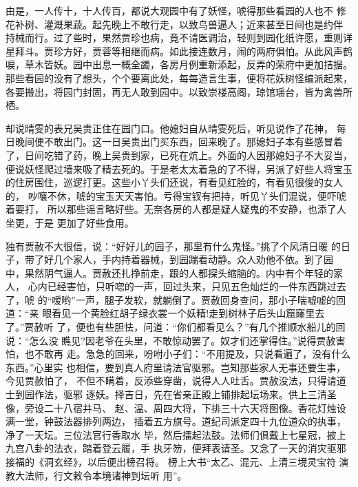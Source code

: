 由是，一人传十，十人传百，都说大观园中有了妖怪，唬得那些看园的人也不
修花补树、灌溉果蔬。起先晚上不敢行走，以致鸟兽逼人；近来甚至日间也是约伴
持械而行。过了些时，果然贾珍也病，竟不请医调治，轻则到园化纸许愿，重则详
星拜斗。贾珍方好，贾蓉等相继而病。如此接连数月，闹的两府俱怕。从此风声鹤
唳，草木皆妖。园中出息一概全蠲，各房月例重新添起，反弄的荣府中更加拮据。
那些看园的没有了想头，个个要离此处，每每造言生事，便将花妖树怪编派起来，
各要搬出，将园门封固，再无人敢到园中。以致崇楼高阁，琼馆瑶台，皆为禽兽所
栖。

却说晴雯的表兄吴贵正住在园门口。他媳妇自从晴雯死后，听见说作了花神，
每日晚间便不敢出门。这一日吴贵出门买东西，回来晚了。那媳妇子本有些感冒着
了，日间吃错了药，晚上吴贵到家，已死在炕上。外面的人因那媳妇子不大妥当，
便说妖怪爬过墙来吸了精去死的。于是老太太着急的了不得，另派了好些人将宝玉
的住房围住，巡逻打更。这些小丫头们还说，有看见红脸的，有看见很俊的女人的，
吵嚷不休，唬的宝玉天天害怕。亏得宝钗有把持，听见丫头们混说，便吓唬着要打，
所以那些谣言略好些。无奈各房的人都是疑人疑鬼的不安静，也添了人坐更，于是
更加了好些食用。

独有贾赦不大很信，说：“好好儿的园子，那里有什么鬼怪。”挑了个风清日暖
的日子，带了好几个家人，手内持着器械，到园踹看动静。众人劝他不依。到了园
中，果然阴气逼人。贾赦还扎挣前走，跟的人都探头缩脑的。内中有个年轻的家人，
心内已经害怕，只听唿的一声，回过头来，只见五色灿烂的一件东西跳过去了，唬
的“嗳哟”一声，腿子发软，就躺倒了。贾赦回身查问，那小子喘嘘嘘的回道：“亲
眼看见一个黄脸红胡子绿衣裳一个妖精!走到树林子后头山窟窿里去了。”贾赦听
了，便也有些胆怯，问道：“你们都看见么？”有几个推顺水船儿的回说：“怎么没
瞧见?因老爷在头里，不敢惊动罢了。奴才们还掌得住。”说得贾赦害怕，也不敢再
走。急急的回来，吩咐小子们：“不用提及，只说看遍了，没有什么东西。”心里实
也相信，要到真人府里请法官驱邪。岂知那些家人无事还要生事，今见贾赦怕了，
不但不瞒着，反添些穿凿，说得人人吐舌。贾赦没法，只得请道士到园作法，驱邪
逐妖。择吉日，先在省亲正殿上铺排起坛场来。供上三清圣像，旁设二十八宿并马、
赵、温、周四大将，下排三十六天将图像。香花灯烛设满一堂，钟鼓法器排列两边，
插着五方旗号。道纪司派定四十九位道众的执事，净了一天坛。三位法官行香取水
毕，然后擂起法鼓。法师们俱戴上七星冠，披上九宫八卦的法衣，踏着登云履，手
执牙笏，便拜表请圣。又念了一天的消灾驱邪接福的《洞玄经》，以后便出榜召将。
榜上大书“太乙、混元、上清三境灵宝符演教大法师，行文敕令本境诸神到坛听
用”。

